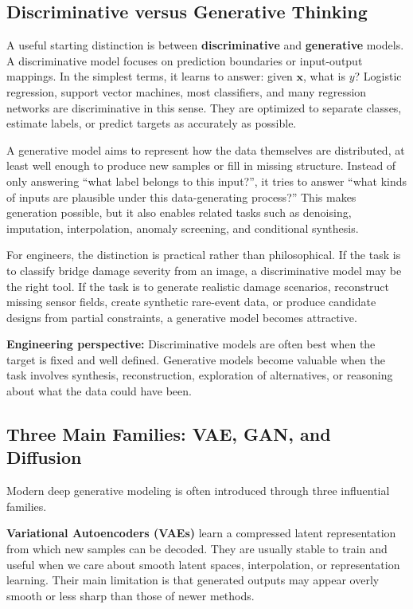 \documentclass[12pt]{article}
\begin{document}
\subsection{Discriminative versus Generative Thinking}

A useful starting distinction is between \textbf{discriminative} and \textbf{generative} models. A discriminative model focuses on prediction boundaries or input-output mappings. In the simplest terms, it learns to answer: given $\mathbf{x}$, what is $y$? Logistic regression, support vector machines, most classifiers, and many regression networks are discriminative in this sense. They are optimized to separate classes, estimate labels, or predict targets as accurately as possible.

A generative model aims to represent how the data themselves are distributed, at least well enough to produce new samples or fill in missing structure. Instead of only answering ``what label belongs to this input?'', it tries to answer ``what kinds of inputs are plausible under this data-generating process?'' This makes generation possible, but it also enables related tasks such as denoising, imputation, interpolation, anomaly screening, and conditional synthesis.

For engineers, the distinction is practical rather than philosophical. If the task is to classify bridge damage severity from an image, a discriminative model may be the right tool. If the task is to generate realistic damage scenarios, reconstruct missing sensor fields, create synthetic rare-event data, or produce candidate designs from partial constraints, a generative model becomes attractive.

\begin{alert-box}
\textbf{Engineering perspective:} Discriminative models are often best when the target is fixed and well defined. Generative models become valuable when the task involves synthesis, reconstruction, exploration of alternatives, or reasoning about what the data could have been.
\end{alert-box}

\subsection{Three Main Families: VAE, GAN, and Diffusion}

Modern deep generative modeling is often introduced through three influential families.

\textbf{Variational Autoencoders (VAEs)} learn a compressed latent representation from which new samples can be decoded. They are usually stable to train and useful when we care about smooth latent spaces, interpolation, or representation learning. Their main limitation is that generated outputs may appear overly smooth or less sharp than those of newer methods.
\end{document}
